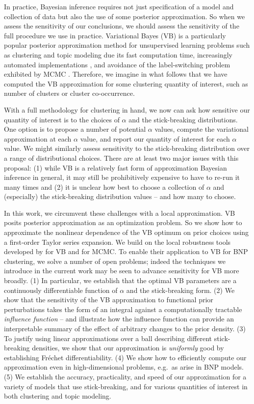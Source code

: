 In practice, Bayesian inference requires not just specification of a model and
collection of data but also the use of some posterior approximation. So when we
assess the sensitivity of our conclusions, we should assess the sensitivity of
the full procedure we use in practice. Variational Bayes (VB) is a particularly
popular posterior approximation method for unsupervised learning problems such
as clustering and topic modeling due its fast computation time, increasingly
automated implementations \citep{ranganath:2013:black, kucukelbir:2016:advi},
and avoidance of the label-switching problem exhibited by MCMC
\citep{jasra:2005:mcmclabelswitch}. Therefore, we imagine in what follows that
we have computed the VB approximation for some clustering quantity of interest,
such as number of clusters or cluster co-occurrence.

With a full methodology for clustering in hand, we now can ask how sensitive our
quantity of interest is to the choices of $\alpha$ and the stick-breaking
distributions. One option is to propose a number of potential $\alpha$ values,
compute the variational approximation at each $\alpha$ value, and report our
quantity of interest for each $\alpha$ value. We might similarly assess
sensitivity to the stick-breaking distribution over a range of distributional
choices. There are at least two major issues with this proposal: (1) while VB is
a relatively fast form of approximation Bayesian inference in general, it may
still be prohibitively expensive to have to re-run it many times and (2) it is
unclear how best to choose a collection of $\alpha$ and (especially) the
stick-breaking distribution values -- and how many to choose.

In this work, we circumvent these challenges with a local approximation. VB
posits posterior approximation as an optimization problem. So we show how to
approximate the nonlinear dependence of the VB optimum on prior choices using a
first-order Taylor series expansion. We build on the local robustness tools
developed by \cite{giordano:2018:covariances} for VB and
\cite{gustafson:1996:local} for MCMC. To enable their application to VB for BNP
clustering, we solve a number of open problems; indeed the techniques we
introduce in the current work may be seen to advance sensitivity for VB more
broadly. (1) In particular, we establish that the optimal VB parameters are a
continuously differentiable function of $\alpha$ and the stick-breaking form.
(2) We show that the sensitivity of the VB approximation to functional prior
perturbations takes the form of an integral against a computationally tractable
\textit{influence function} -- and illustrate how the influence function can
provide an interpretable summary of the effect of arbitrary changes to the prior
density. (3) To justify using linear approximations over a ball describing
different stick-breaking densities, we show that our approximation is
\textit{uniformly} good by establishing Fr\'echet differentiability. (4) We show how
to efficiently compute our approximation even in high-dimensional problems,
e.g.\ as arise in BNP models. (5) We establish the accuracy, practicality, and
speed of our approximation for a variety of models that use stick-breaking, and
for various quantities of interest in both clustering and topic modeling.
